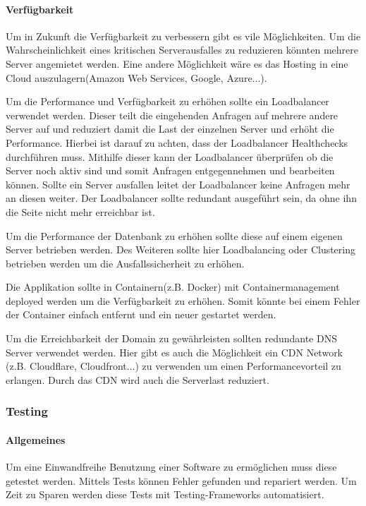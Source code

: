 \newpage

\paragraph{Verfügbarkeit}
Um in Zukunft die Verfügbarkeit zu verbessern gibt es vile Möglichkeiten. Um die Wahrscheinlichkeit eines kritischen Serverausfalles zu reduzieren könnten mehrere Server angemietet werden. Eine andere Möglichkeit wäre es das Hosting in eine Cloud auszulagern(Amazon Web Services, Google, Azure...). 

Um die Performance und Verfügbarkeit zu erhöhen sollte ein Loadbalancer verwendet werden. Dieser teilt die eingehenden Anfragen auf mehrere andere Server auf und reduziert damit die Last der einzelnen Server und erhöht die Performance. Hierbei ist darauf zu achten, dass der Loadbalancer Healthchecks durchführen muss. Mithilfe dieser kann der Loadbalancer überprüfen ob die Server noch aktiv sind und somit Anfragen entgegennehmen und bearbeiten können. Sollte ein Server ausfallen leitet der Loadbalancer keine Anfragen mehr an diesen weiter. Der Loadbalancer sollte redundant ausgeführt sein, da ohne ihn die Seite nicht mehr erreichbar ist. 

Um die Performance der Datenbank zu erhöhen sollte diese auf einem eigenen Server betrieben werden. Des Weiteren sollte hier Loadbalancing oder Clustering betrieben werden um die Ausfallssicherheit zu erhöhen. 

Die Applikation sollte in Containern(z.B. Docker) mit Containermanagement deployed werden um die Verfügbarkeit zu erhöhen. Somit könnte bei einem Fehler der Container einfach entfernt und ein neuer gestartet werden. 

Um die Erreichbarkeit der Domain zu gewährleisten sollten redundante DNS Server verwendet werden. Hier gibt es auch die Möglichkeit ein CDN Network (z.B. Cloudflare, Cloudfront...) zu verwenden um einen Performancevorteil zu erlangen. Durch das CDN wird auch die Serverlast reduziert.

\subsubsection{Testing}
\paragraph{Allgemeines}
Um eine Einwandfreihe Benutzung einer Software zu ermöglichen muss diese getestet werden. Mittels Tests können Fehler gefunden und repariert werden. Um Zeit zu Sparen werden diese Tests mit Testing-Frameworks automatisiert.


